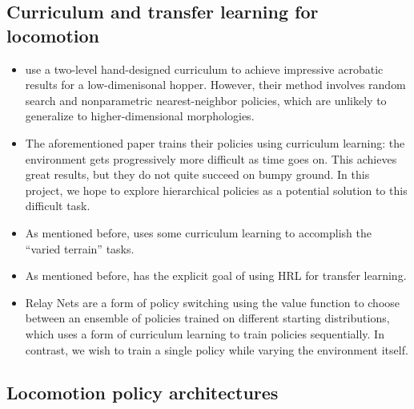 \documentclass[a4paper]{article}
\begin{document}
\subsection*{Curriculum and transfer learning for locomotion}

\begin{itemize}
  \item \cite{karpathy2012curriculum} use a two-level hand-designed curriculum to achieve impressive acrobatic results for a low-dimenisonal hopper.
    However, their method involves random search and nonparametric nearest-neighbor policies, which are unlikely to generalize to higher-dimensional morphologies.

  \item The aforementioned paper \cite{heess2017emergence} trains their policies using curriculum learning: the environment gets progressively more difficult as time goes on.
    This achieves great results, but they do not quite succeed on bumpy ground.
    In this project, we hope to explore hierarchical policies as a potential solution to this difficult task.

  \item As mentioned before, \cite{peng2018deepmimic} uses some curriculum learning to accomplish the ``varied terrain'' tasks.

  \item As mentioned before, \cite{frans2018meta} has the explicit goal of using HRL for transfer learning.

  \item Relay Nets \citep{kumar2017relay} are a form of policy switching using the value function to choose between an ensemble of policies trained on different starting distributions, which uses a form of curriculum learning to train policies sequentially.
    In contrast, we wish to train a single policy while varying the environment itself.

\end{itemize}

\subsection*{Locomotion policy architectures}
\end{document}

